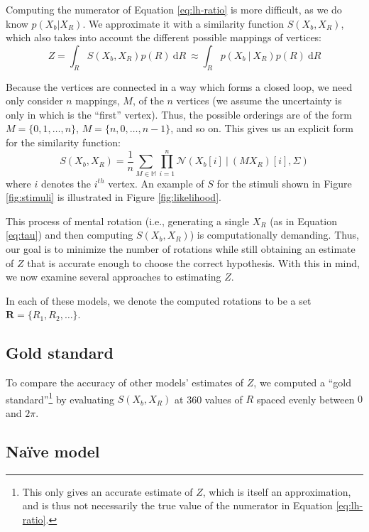 \documentclass{article} %
\newcommand{\Naive}[0]{Na\"ive}
\begin{document}
Computing the numerator of Equation \ref{eq:lh-ratio} is more
difficult, as we do know $p(X_b\vert X_R)$. We approximate it with a
similarity function $S(X_b, X_R)$, which also takes into account the
different possible mappings of vertices:
\begin{equation}
  Z=\int_R S(X_b, X_R)p(R)\ \mathrm{d}R\ \approx\int_Rp(X_b\ \vert\ X_R)p(R)\ \mathrm{d}R
  \label{eq:Z}
\end{equation}

Because the vertices are connected in a way which forms a closed loop,
we need only consider $n$ mappings, $M$, of the $n$ vertices (we
assume the uncertainty is only in which is the ``first''
vertex). Thus, the possible orderings are of the form $M=\lbrace{}0,
1, \ldots{}, n\rbrace{}$, $M=\lbrace{}n, 0, \ldots{}, n-1\rbrace{}$,
and so on. This gives us an explicit form for the similarity function:
\begin{equation}
  S(X_b, X_R)=\frac{1}{n}\sum_{M\in\mathbb{M}}\prod_{i=1}^n\mathcal{N}(X_b[i]\ \vert \ (MX_R)[i], \Sigma)
  \label{eq:similarity}
\end{equation}
where $i$ denotes the $i^{th}$ vertex. An example of $S$ for the
stimuli shown in Figure \ref{fig:stimuli} is illustrated in Figure
\ref{fig:likelihood}.

This process of mental rotation (i.e., generating a single $X_R$ (as
in Equation \ref{eq:tau}) and then computing $S(X_b, X_R)$) is
computationally demanding. Thus, our goal is to minimize the number of
rotations while still obtaining an estimate of $Z$ that is accurate
enough to choose the correct hypothesis. With this in mind, we now
examine several approaches to estimating $Z$.

In each of these models, we denote the computed rotations to be a set
$\mathbf{R}=\{R_1, R_2, \ldots{}\}$.

\subsection{Gold standard}

To compare the accuracy of other models' estimates of $Z$, we computed
a ``gold standard''\footnote{This only gives an accurate estimate of
  $Z$, which is itself an approximation, and is thus not necessarily
  the true value of the numerator in Equation \ref{eq:lh-ratio}.} by
evaluating $S(X_b, X_R)$ at 360 values of $R$ spaced evenly between
$0$ and $2\pi$.

\subsection{\Naive{} model}
\end{document}
